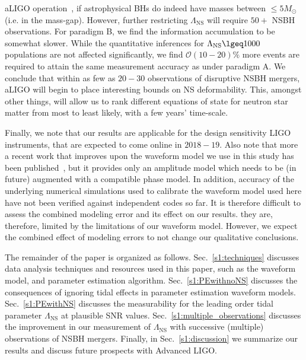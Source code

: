 \documentclass[aps,prd,amsmath,floats,floatfix, twocolumn,
superscriptaddress,nofootinbib,showpacs]{revtex4-1}
\newcommand{\lambdans}{\Lambda_\mathrm{NS}}
\begin{document}
aLIGO operation~\cite{Abadie:2010cfa}, if astrophysical BHs do indeed have
masses between $\leq 5M_\odot$ (i.e. in the mass-gap). However, further
restricting $\lambdans$ will require $50+$ NSBH observations.
% 
For paradigm B, we find the information accumulation to be somewhat slower.
While the quantitative inferences for $\lambdans\lgeq1000$ populations are
not affected significantly, we find $\mathcal{O}(10-20)\%$ more events are
required to attain the same measurement accuracy as under paradigm A.
% 
We conclude that within as few as $20-30$ observations of disruptive NSBH
mergers, aLIGO will begin to place interesting bounds on NS deformability.
This, amongst other things, will allow us to rank different equations of 
state for neutron star matter from most to least likely, with a few years'
time-scale.




Finally, we note that our results are applicable for the design sensitivity
LIGO instruments, that are expected to come online in $2018-19$. Also note
that more a recent work that improves upon the waveform model we use in this
study has been published~\cite{Pannarale:2015jka}, but it provides only an 
amplitude model which needs to be (in future) augmented with a compatible
phase model. In addition, accuracy of the underlying numerical simulations 
used to calibrate the waveform model used here have not been verified against 
independent codes so far.
It is therefore difficult to assess the combined modeling error and its effect
on our results. they are, therefore, limited by the limitations of our
waveform model. However, we expect the combined effect of modeling errors to
not change our qualitative conclusions.




The remainder of the paper is organized as follows. 
Sec.~\ref{s1:techniques} discusses data analysis techniques and resources 
used in this paper, such as the waveform model, and parameter estimation 
algorithm.
Sec.~\ref{s1:PEwithnoNS} discusses the consequences of ignoring tidal 
effects in parameter estimation waveform models.
Sec.~\ref{s1:PEwithNS} discusses the measurability for the leading order
tidal parameter $\lambdans$ at plausible SNR values.
Sec.~\ref{s1:multiple_observations} discusses the improvement in our
measurement of $\lambdans$ with successive (multiple) observations of
NSBH mergers.
Finally, in Sec.~\ref{s1:discussion} we summarize our results and discuss
future prospects with Advanced LIGO.
\end{document}
